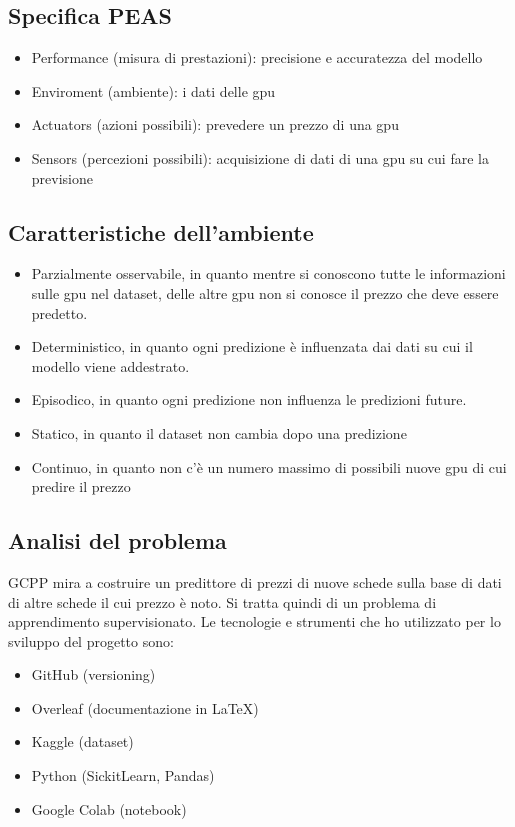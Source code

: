 \documentclass{article}
\begin{document}
    \subsection{Specifica PEAS}
        \begin{itemize}
        \item Performance (misura di prestazioni): precisione e accuratezza del modello
        \item Enviroment (ambiente): i dati delle gpu 
        \item Actuators (azioni possibili): prevedere un prezzo di una gpu
        \item Sensors (percezioni possibili): acquisizione di dati di una gpu su cui fare la previsione
        \end{itemize}
    \subsection{Caratteristiche dell'ambiente}
        \begin{itemize}
        \item Parzialmente osservabile, in quanto mentre si conoscono tutte le informazioni sulle gpu nel dataset, delle altre gpu non si conosce il prezzo che deve essere predetto.
        \item Deterministico, in quanto ogni predizione è influenzata dai dati su cui il modello viene addestrato.
        \item Episodico, in quanto ogni predizione non influenza le predizioni future. 
        \item Statico, in quanto il dataset non cambia dopo una predizione
        \item Continuo, in quanto non c'è un numero massimo di possibili nuove gpu di cui predire il prezzo
        \end{itemize}
    
    \subsection{Analisi del problema}
    GCPP mira a costruire un predittore di prezzi di nuove schede sulla base di dati di altre schede il cui prezzo è noto. 
    Si tratta quindi di un problema di apprendimento supervisionato.
    Le tecnologie e strumenti che ho utilizzato per lo sviluppo del progetto sono:
        \begin{itemize}      
        \item GitHub (versioning)
        \item Overleaf (documentazione in \LaTeX)
        \item Kaggle (dataset)
        \item Python (SickitLearn, Pandas)
        \item Google Colab (notebook)
        \end{itemize}
\end{document}

